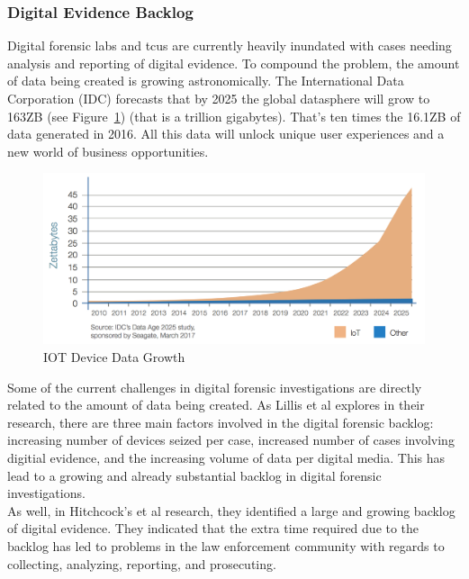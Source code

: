 \documentclass[12pt]{article}
\begin{document}
\subsubsection{Digital Evidence Backlog}

Digital forensic labs and \glspl{tcu} are currently heavily inundated with cases needing
analysis and reporting of digital evidence.  To compound the problem, the amount of
data being created is growing astronomically.  The International Data Corporation
(IDC) forecasts that by 2025 the global datasphere will grow to 163ZB (see
Figure~\ref{fig:IOT}) (that is a trillion gigabytes)\cite{IDCDataAge2017}. That's ten times the 16.1ZB
of data generated in 2016. All this data will unlock unique user experiences and
a new world of business opportunities.\\

\begin{figure}[H]
  \centering
    \includegraphics[width=\textwidth]{images/IOT_chart.jpg}
  \caption{IOT Device Data Growth}
  \label{fig:IOT}
\end{figure}

Some of the current challenges in digital forensic investigations are directly
related to the amount of data being created.  As Lillis et al\cite{lillis2016current}
explores in their research, there are three main factors involved in the digital
forensic backlog: increasing number of devices seized per case, increased number of
cases involving digitial evidence, and the increasing volume of data per digital
media.  This has lead to a growing and already substantial backlog in digital
forensic investigations.\\

As well, in Hitchcock's et al\cite{hitchcock2016tiered} research, they identified
a large and growing backlog of digital evidence.  They indicated that the extra
time required due to the backlog has led to problems in the law enforcement
community with regards to collecting, analyzing, reporting, and prosecuting.\\
\end{document}

